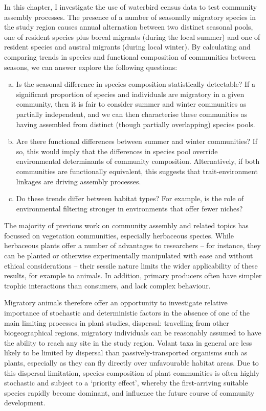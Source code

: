 \documentclass[12pt,a4paper]{book}
\begin{document}
In this chapter, I investigate the use of waterbird census data to test community assembly processes. The presence of a number of seasonally migratory species in the study region causes annual alternation between two distinct seasonal pools, one of resident species plus boreal migrants (during the local summer) and one of resident species and austral migrants (during local winter). By calculating and comparing trends in species and functional composition of communities between seasons, we can answer explore the following questions:
\begin{enumerate}[(a)]
\item Is the seasonal difference in species composition statistically detectable? If a significant proportion of species and individuals are migratory in a given community, then it is fair to consider summer and winter communities as partially independent, and we can then characterise these communities as having assembled from distinct (though partially overlapping) species pools.
\item Are there functional differences between summer and winter communities? If so, this would imply that the differences in species pool override environmental determinants of community composition. Alternatively, if both communities are functionally equivalent, this suggests that trait-environment linkages are driving assembly processes.
\item Do these trends differ between habitat types? For example, is the role of environmental filtering stronger in environments that offer fewer niches?
\end{enumerate}

The majority of previous work on community assembly and related topics has focussed on vegetation communities, especially herbaceous species. While herbaceous plants offer a number of advantages to researchers -- for instance, they can be planted or otherwise experimentally manipulated with ease and without ethical considerations -- their sessile nature limits the wider applicability of these results, for example to animals. In addition, primary producers often have simpler trophic interactions than consumers, and lack complex behaviour.

Migratory animals therefore offer an opportunity to investigate relative importance of stochastic and deterministic factors in the absence of one of the main limiting processes in plant studies, dispersal: travelling from other biogeographical regions, migratory individuals can be reasonably assumed to have the ability to reach any site in the study region. Volant taxa in general are less likely to be limited by dispersal than passively-transported organisms such as plants, especially as they can fly directly over unfavourable habitat areas. Due to this dispersal limitation, species composition of plant communities is often highly stochastic and subject to a `priority effect', whereby the first-arriving suitable species rapidly become dominant, and influence the future course of community development. 
\end{document}
